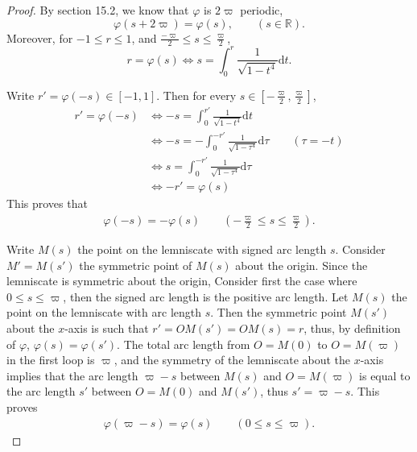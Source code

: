 \documentclass[11pt,a4paper]{article}
\newcommand{\D}{\mathrm{d}}
\newcommand{\R}{\mathbb{R}}
\begin{document}
\begin{proof}
By section 15.2, we know that $\varphi$ is $2\varpi$ periodic,
$$\varphi(s + 2\varpi) = \varphi(s),\qquad (s \in \R).$$
Moreover, for $-1 \leq r \leq 1$, and $\frac{-\varpi}{2} \leq s \leq \frac{\varpi}{2}$,
$$r = \varphi(s) \iff s = \int_0^r \frac{1}{\sqrt{1-t^4}} \D t.$$

Write $r' = \varphi(-s)\in [-1,1]$. Then for every $s \in [-\frac{\varpi}{2} ,\frac{\varpi}{2} ]$,
\begin{align*}
r' = \varphi(-s) & \iff -s = \int_0^{r'} \frac{1}{\sqrt{1-t^4}} \D t\\
&\iff -s = -\int _0^{-r'} \frac{1}{\sqrt{1-\tau^4}} \D \tau\qquad (\tau = -t)\\
&\iff s = \int _0^{-r'} \frac{1}{\sqrt{1-\tau^4}} \D \tau\\
&\iff -r' = \varphi(s)
\end{align*}
This proves that
\begin{align}
\varphi(-s) = - \varphi(s) \qquad \left (-\frac{\varpi}{2} \leq s \leq \frac{\varpi}{2} \right).
\end{align}

Write $M(s)$ the point on the lemniscate with signed arc length $s$. Consider $M' = M(s')$ the symmetric point of $M(s)$ about the origin. Since the lemniscate is symmetric about the origin, 
Consider first the case where $0 \leq s \leq \varpi$, then the signed arc length is the positive arc length. Let $M(s)$ the point on the lemniscate with arc length $s$. Then the symmetric point $M(s')$ about the $x$-axis is such that $r' = OM(s') = OM(s) = r$, thus, by definition of $\varphi$, $\varphi(s) = \varphi(s')$. The total arc length from $O = M(0)$ to $O = M(\varpi)$ in the first loop is $\varpi$, and the symmetry of the lemniscate about the $x$-axis implies that the arc length $\varpi - s$ between $M(s)$ and $O = M(\varpi)$ is equal to the arc length $s'$ between $O = M(0)$ and $M(s')$, thus
$s' = \varpi - s$. This proves
\begin{align}
\varphi(\varpi -s) = \varphi(s)\qquad (0 \leq s \leq \varpi).
\end{align} 


\end{proof}
\end{document}
